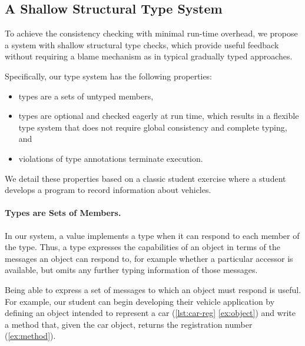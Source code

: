 \subsection{A Shallow Structural Type System}

To achieve the consistency checking with minimal run-time overhead,
we propose a system with shallow structural type checks,
which provide useful feedback without requiring a blame mechanism
as in typical gradually typed approaches.


Specifically, our type system has the following properties:

\begin{itemize}
  \item types are a sets of untyped members,
  \item types are optional and checked eagerly at run time,
        which results in a flexible type system that does not require global
        consistency and complete typing, and
  \item violations of type annotations terminate execution.
\end{itemize}


We detail these properties
based on a classic student exercise where a student develops
a program to record information about vehicles.

\paragraph{Types are Sets of Members.}

In our system, a value implements a type when it
can respond to each member of the type.
Thus, a type expresses the capabilities
of an object in terms of the messages an object
can respond to, for example whether a particular accessor is
available, but omits any further typing information of those messages.

Being able to express a set of messages to which an object
must respond is useful. For example, our student can begin
developing their vehicle application
by defining an object
intended to represent a car (\cref{lst:car-reg} \cref{ex:object}) and write a method that, 
given the car object,
returns the registration number (\cref{ex:method}).


